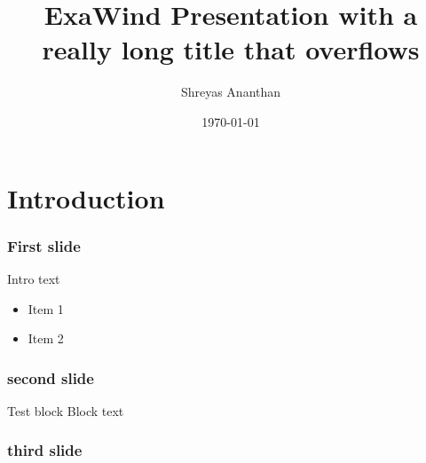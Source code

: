\documentclass[aspectratio=1610,10pt]{beamer}
\title{ExaWind Presentation with a really long title that overflows }
\author{Shreyas Ananthan}
\institute[NREL]{National Renewable Energy Laboratory \\ Golden, CO}
\date{\today}
\begin{document}
\maketitle

\section{Introduction}

\begin{frame}
  \frametitle{First slide}
  Intro text
  \begin{itemize}
  \item Item 1
  \item Item 2
  \end{itemize}
\end{frame}

\begin{frame}
  \frametitle{second slide}
  \begin{block}{Test block}
    Block text
  \end{block}
\end{frame}

\begin{frame}
  \frametitle{third slide}
\end{frame}
\end{document}
